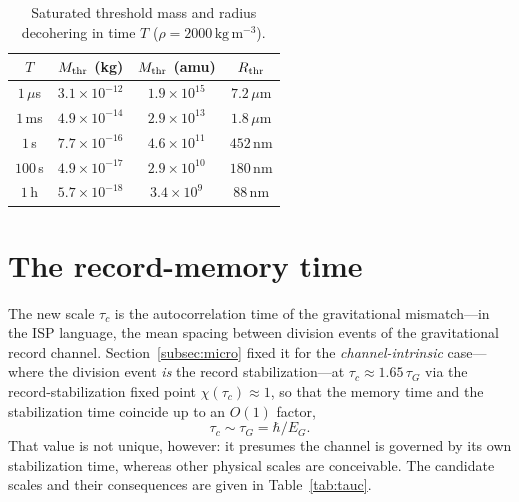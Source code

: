 \documentclass[aps,prd,onecolumn,amsmath,amssymb,nofootinbib,superscriptaddress]{revtex4-2}
\begin{document}
\begin{table}[h]
\centering
\caption{Saturated threshold mass and radius decohering in time $T$ ($\rho=2000\,\mathrm{kg\,m^{-3}}$).}
\label{tab:thresholds}
\begin{tabular}{cccc}
\hline\hline
$T$ & $M_{\rm thr}$ (kg) & $M_{\rm thr}$ (amu) & $R_{\rm thr}$ \\
\hline
$1\,\mu$s & $3.1\times10^{-12}$ & $1.9\times10^{15}$ & $7.2\,\mu$m \\
$1\,$ms & $4.9\times10^{-14}$ & $2.9\times10^{13}$ & $1.8\,\mu$m \\
$1\,$s & $7.7\times10^{-16}$ & $4.6\times10^{11}$ & $452\,$nm \\
$100\,$s & $4.9\times10^{-17}$ & $2.9\times10^{10}$ & $180\,$nm \\
$1\,$h & $5.7\times10^{-18}$ & $3.4\times10^{9}$ & $88\,$nm \\
\hline\hline
\end{tabular}
\end{table}

\section{The record-memory time}\label{sec:tauc}

The new scale $\tau_c$ is the autocorrelation time of the gravitational mismatch---in the ISP
language, the mean spacing between division events of the gravitational record channel.
Section~\ref{subsec:micro} fixed it for the \emph{channel-intrinsic} case---where the division event
\emph{is} the record stabilization---at $\tau_c\approx1.65\,\tau_G$ via the record-stabilization fixed
point $\chi(\tau_c)\approx1$, so that the memory time and the stabilization time coincide up to an
$O(1)$ factor,
\begin{equation}
\tau_c\sim\tau_G=\hbar/E_G.
\end{equation}
That value is not unique, however: it presumes the channel is governed by its own stabilization time,
whereas other physical scales are conceivable. The candidate scales and their consequences are
given in Table~\ref{tab:tauc}.
\end{document}
